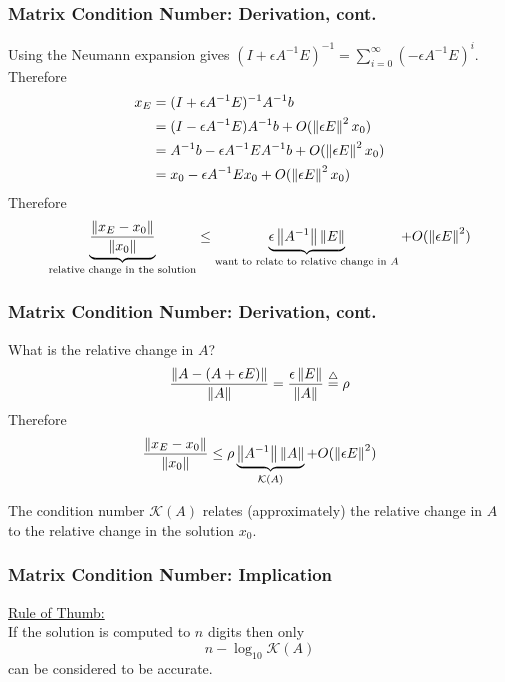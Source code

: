 \documentclass{beamer}
\begin{document}
\begin{frame}\frametitle{Matrix Condition Number: Derivation, cont.}
	Using the Neumann expansion gives
	$(I+\epsilon A^{-1}E)^{-1} = \displaystyle \sum_{i=0}^{\infty} (-\epsilon A^{-1} E)^i$.  Therefore
	\begin{align*}
		x_E &= (I+\epsilon A^{-1}E)^{-1}A^{-1}b \\ 
		&=(I - \epsilon A^{-1} E)A^{-1}b + O(\left\|\epsilon E \right\|^2x_0)\\
		&= A^{-1}b - \epsilon A^{-1}EA^{-1}b + O(\left\|\epsilon E \right\|^2x_0)\\
		&= x_0 - \epsilon A^{-1}Ex_0 + O(\left\|\epsilon E \right\|^2x_0)
	\end{align*}
	Therefore
	\[\underbrace{\displaystyle\frac{\left\|x_E-x_0 \right\|}{\left\|x_0 \right\|}}_{\text{relative change in the solution}} \leq \underbrace{\epsilon\left\|A^{-1} \right\|\left\|E \right\|}_{\text{want to relate to relative change in $A$}}+O(\left\|\epsilon E \right\|^2)  \]
\end{frame}

\begin{frame}\frametitle{Matrix Condition Number: Derivation, cont.}
	What is the relative change in $A$?
	\[\frac{  \left\|A - (A + \epsilon E) \right\|}{  \left\|A \right\|} = \frac{  \epsilon\left\|E \right\|}{  \left\|A \right\|} \stackrel{\triangle}{=} \rho\]
	Therefore
	\[
		\frac{ \left\|x_E - x_0 \right\|}{\left\|x_0 \right\|} \leq \rho \underbrace{\left\|A^{-1}\right\|\left\|A \right\| }_{\mathcal{K}(A)} + O(\left\|\epsilon E \right\|^2) 
	\]
	
	The condition number $\mathcal{K}(A)$ relates (approximately) the relative change in $A$ to the relative change in the solution $x_0$.
\end{frame}

\begin{frame}\frametitle{Matrix Condition Number: Implication}
	\underline{Rule of Thumb:} \\
	If the solution is computed to $n$ digits then only
	\[ n - \log_{10} \mathcal{K}(A) \]
	can be considered to be accurate.
\end{frame}
\end{document}
